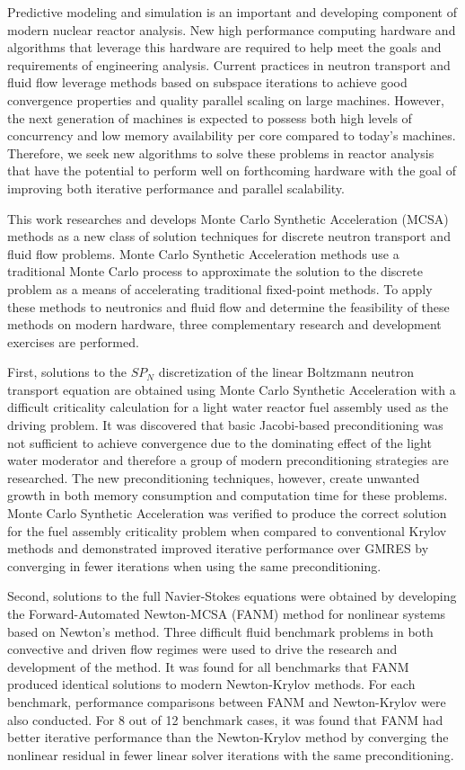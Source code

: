 Predictive modeling and simulation is an important and developing
component of modern nuclear reactor analysis. New high performance
computing hardware and algorithms that leverage this hardware are
required to help meet the goals and requirements of engineering
analysis. Current practices in neutron transport and fluid flow
leverage methods based on subspace iterations to achieve good
convergence properties and quality parallel scaling on large
machines. However, the next generation of machines is expected to
possess both high levels of concurrency and low memory availability
per core compared to today's machines. Therefore, we seek new
algorithms to solve these problems in reactor analysis that have the
potential to perform well on forthcoming hardware with the goal of
improving both iterative performance and parallel scalability.

This work researches and develops Monte Carlo Synthetic Acceleration
(MCSA) methods as a new class of solution techniques for discrete
neutron transport and fluid flow problems. Monte Carlo Synthetic
Acceleration methods use a traditional Monte Carlo process to
approximate the solution to the discrete problem as a means of
accelerating traditional fixed-point methods. To apply these methods
to neutronics and fluid flow and determine the feasibility of these
methods on modern hardware, three complementary research and
development exercises are performed.

First, solutions to the $SP_N$ discretization of the linear Boltzmann
neutron transport equation are obtained using Monte Carlo Synthetic
Acceleration with a difficult criticality calculation for a light
water reactor fuel assembly used as the driving problem. It was
discovered that basic Jacobi-based preconditioning was not sufficient
to achieve convergence due to the dominating effect of the light water
moderator and therefore a group of modern preconditioning strategies
are researched. The new preconditioning techniques, however, create
unwanted growth in both memory consumption and computation time for
these problems. Monte Carlo Synthetic Acceleration was verified to
produce the correct solution for the fuel assembly criticality problem
when compared to conventional Krylov methods and demonstrated improved
iterative performance over GMRES by converging in fewer iterations
when using the same preconditioning.

Second, solutions to the full Navier-Stokes equations were obtained by
developing the Forward-Automated Newton-MCSA (FANM) method for
nonlinear systems based on Newton's method. Three difficult fluid
benchmark problems in both convective and driven flow regimes were
used to drive the research and development of the method. It was found
for all benchmarks that FANM produced identical solutions to modern
Newton-Krylov methods. For each benchmark, performance comparisons
between FANM and Newton-Krylov were also conducted. For 8 out of 12
benchmark cases, it was found that FANM had better iterative
performance than the Newton-Krylov method by converging the nonlinear
residual in fewer linear solver iterations with the same
preconditioning.

